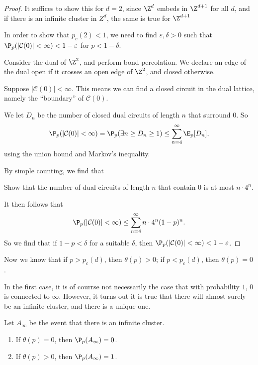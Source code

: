 \documentclass[a4paper]{article}
\begin{document}
\begin{proof}
  It suffices to show this for $d = 2$, since $\Z^d$ embeds in $\Z^{d + 1}$ for all $d$, and if there is an infinite cluster in $Z^d$, the same is true for $\Z^{d + 1}$ 

  In order to show that $p_c(2) < 1$, we need to find $\varepsilon, \delta > 0$ such that $\P_p(|\mathcal{C}(0)| < \infty) < 1 - \varepsilon$ for $p < 1 - \delta$.

  Consider the dual of $\Z^2$, and perform bond percolation. We declare an edge of the dual open if it crosses an open edge of $\Z^2$, and closed otherwise.

  Suppose $|\mathcal{C}(0)| < \infty$. This means we can find a closed circuit in the dual lattice, namely the ``boundary'' of $\mathcal{C}(0)$.

  We let $D_n$ be the number of closed dual circuits of length $n$ that surround $0$. So
  \[
    \P_p(|\mathcal{C}(0)| < \infty) = \P_p(\exists n \geq D_n \geq 1) \leq \sum_{n = 4}^\infty \E_p[D_n],
  \]
  using the union bound and Markov's inequality.

  By simple counting, we find that
  \begin{ex}
    Show that the number of dual circuits of length $n$ that contain $0$ is at most $n \cdot 4^n$.
  \end{ex}
  It then follows that
  \[
    \P_p(|\mathcal{C}(0)| < \infty) \leq \sum_{n = 4}^\infty n \cdot 4^n (1 - p)^n.
  \]
  So we find that if $1 - p < \delta$ for a suitable $\delta$, then $\P_p(|\mathcal{C}(0)| < \infty) < 1 - \varepsilon$.
\end{proof}

Now we know that if $p > p_c(d)$, then $\theta(p) > 0$; if $p < p_c(d)$, then $\theta(p) = 0$.

In the first case, it is of courrse not necessarily the case that with probability $1$, $0$ is connected to $\infty$. However, it turns out it is true that there will almost surely be an infinite cluster, and there is a unique one.

\begin{prop}
  Let $A_\infty$ be the event that there is an infinite cluster. 
  \begin{enumerate}
    \item If $\theta(p) = 0$, then $\P_p(A_\infty) = 0$.
    \item If $\theta(p) > 0$, then $\P_p(A_\infty) = 1$.
  \end{enumerate}
\end{prop}
\end{document}
